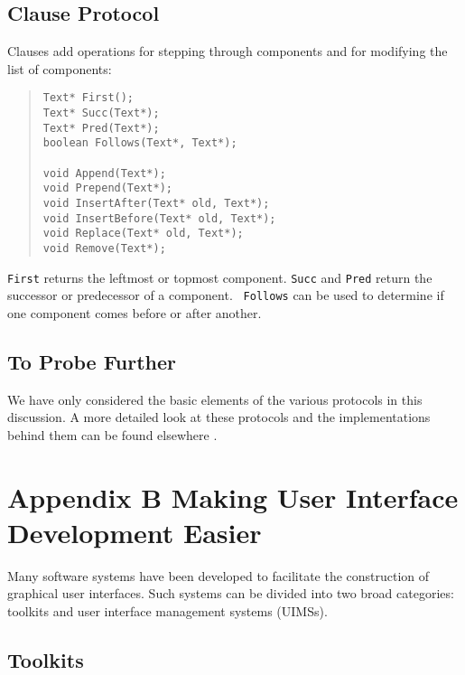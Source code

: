 \subsection*{Clause Protocol}

Clauses add operations for stepping through components and for
modifying the list of components:
\begin{quote}
\small
\begin{verbatim}
Text* First();
Text* Succ(Text*);
Text* Pred(Text*);
boolean Follows(Text*, Text*);

void Append(Text*);
void Prepend(Text*);
void InsertAfter(Text* old, Text*);
void InsertBefore(Text* old, Text*);
void Replace(Text* old, Text*);
void Remove(Text*);
\end{verbatim}
\end{quote}

{\tt First} returns the leftmost or topmost component.  {\tt Succ} and
{\tt Pred} return the successor or predecessor of a component.  {\tt
Follows} can be used to determine if one component comes before or after
another.

\subsection*{To Probe Further}

We have only considered the basic elements of the various protocols in
this discussion.  A more detailed look at these protocols and the
implementations behind them can be found elsewhere
\cite{interviews:impl,interviews:graphic}.

\clearpage

\section*{Appendix B \newline Making User Interface \newline Development
Easier}

Many software systems have been developed to facilitate the
construction of graphical user interfaces.  Such systems can be
divided into two broad categories: toolkits and user interface
management systems (UIMSs).

\subsection*{Toolkits}

